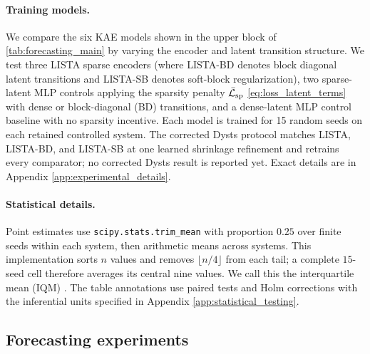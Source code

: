 \documentclass[11pt]{article}
\begin{document}
\paragraph{Training models.} We compare the six KAE models shown in the upper block of \cref{tab:forecasting_main} by varying the encoder and latent transition structure. We test three LISTA sparse encoders (where LISTA-BD denotes block diagonal latent transitions and LISTA-SB denotes soft-block regularization),
two sparse-latent MLP controls applying the sparsity penalty $\bar{\mathcal{L}}_{\rm sp}$ \eqref{eq:loss_latent_terms} with dense \citep{fathi2024course} or block-diagonal (BD) transitions,
and a dense-latent MLP control baseline with no sparsity incentive.
Each model is trained for 15 random seeds on each retained controlled system. The corrected Dysts protocol matches LISTA, LISTA-BD, and LISTA-SB at one learned shrinkage refinement and retrains every comparator; no corrected Dysts result is reported yet. Exact details are in Appendix \ref{app:experimental_details}.
\paragraph{Statistical details.}
Point estimates use \texttt{scipy.stats.trim\_mean} with proportion \(0.25\) over finite seeds within each system, then arithmetic means across systems. This implementation sorts \(n\) values and removes \(\lfloor n/4\rfloor\) from each tail; a complete \(15\)-seed cell therefore averages its central nine values. We call this the interquartile mean (IQM) \citep{agarwal2021deep}.
The table annotations use paired tests and Holm corrections with the inferential units specified in Appendix \ref{app:statistical_testing}.
\subsection{Forecasting experiments}
\begin{table}[tbp]
\centering
\caption{Forecasting performance on the \(15\)-system controlled multibasin benchmark; lower is better. Each KAE cell is an arithmetic mean across systems after a \(25\%\)-per-tail trimmed mean over seeds within each system; complete \(15\)-seed cells average the central nine values. Superscripts mark within-system paired Wilcoxon tests against Dense MLP after Holm correction across systems (\(\ast\), \(p<0.05\)). Standalone controls use three configured seeds and independently generated evaluation trajectories, so they are unmatched descriptive references rather than formal comparisons. Classical DMD/EDMD require each contributing start to have a finite mean through \(H\), whereas KAE and mixture-local rows permit finite-prefix contribution. \textbf{Bold} marks the best KAE entry. Historical Dysts values are excluded after a timestep-provenance failure.}
\label{tab:forecasting_main}
{\setlength{\tabcolsep}{2pt}
\resizebox{0.72\textwidth}{!}{}}
\end{table}
\end{document}
